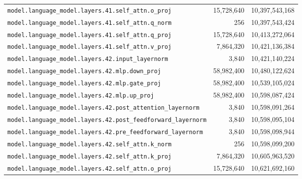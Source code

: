 \documentclass[10pt,a4paper]{article}
\theoremstyle{definition}
\begin{document}
\begin{appendices}
\begin{longtable}{p{9.5cm}rr}
\texttt{model.\allowbreak{}language\_model.\allowbreak{}layers.\allowbreak{}41.\allowbreak{}self\_attn.\allowbreak{}o\_proj} & 15,728,640 & 10,397,543,168 \\
\texttt{model.\allowbreak{}language\_model.\allowbreak{}layers.\allowbreak{}41.\allowbreak{}self\_attn.\allowbreak{}q\_norm} & 256 & 10,397,543,424 \\
\texttt{model.\allowbreak{}language\_model.\allowbreak{}layers.\allowbreak{}41.\allowbreak{}self\_attn.\allowbreak{}q\_proj} & 15,728,640 & 10,413,272,064 \\
\texttt{model.\allowbreak{}language\_model.\allowbreak{}layers.\allowbreak{}41.\allowbreak{}self\_attn.\allowbreak{}v\_proj} & 7,864,320 & 10,421,136,384 \\
\texttt{model.\allowbreak{}language\_model.\allowbreak{}layers.\allowbreak{}42.\allowbreak{}input\_layernorm} & 3,840 & 10,421,140,224 \\
\texttt{model.\allowbreak{}language\_model.\allowbreak{}layers.\allowbreak{}42.\allowbreak{}mlp.\allowbreak{}down\_proj} & 58,982,400 & 10,480,122,624 \\
\texttt{model.\allowbreak{}language\_model.\allowbreak{}layers.\allowbreak{}42.\allowbreak{}mlp.\allowbreak{}gate\_proj} & 58,982,400 & 10,539,105,024 \\
\texttt{model.\allowbreak{}language\_model.\allowbreak{}layers.\allowbreak{}42.\allowbreak{}mlp.\allowbreak{}up\_proj} & 58,982,400 & 10,598,087,424 \\
\texttt{model.\allowbreak{}language\_model.\allowbreak{}layers.\allowbreak{}42.\allowbreak{}post\_attention\_layernorm} & 3,840 & 10,598,091,264 \\
\texttt{model.\allowbreak{}language\_model.\allowbreak{}layers.\allowbreak{}42.\allowbreak{}post\_feedforward\_layernorm} & 3,840 & 10,598,095,104 \\
\texttt{model.\allowbreak{}language\_model.\allowbreak{}layers.\allowbreak{}42.\allowbreak{}pre\_feedforward\_layernorm} & 3,840 & 10,598,098,944 \\
\texttt{model.\allowbreak{}language\_model.\allowbreak{}layers.\allowbreak{}42.\allowbreak{}self\_attn.\allowbreak{}k\_norm} & 256 & 10,598,099,200 \\
\texttt{model.\allowbreak{}language\_model.\allowbreak{}layers.\allowbreak{}42.\allowbreak{}self\_attn.\allowbreak{}k\_proj} & 7,864,320 & 10,605,963,520 \\
\texttt{model.\allowbreak{}language\_model.\allowbreak{}layers.\allowbreak{}42.\allowbreak{}self\_attn.\allowbreak{}o\_proj} & 15,728,640 & 10,621,692,160 \\

\end{longtable}
\end{appendices}
\end{document}
